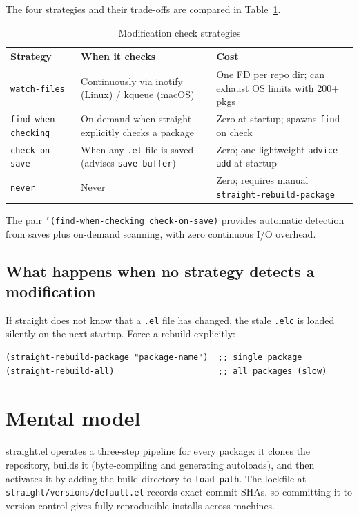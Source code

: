The four strategies and their trade-offs are compared in Table~\ref{tab:straight-check-strategies}.

\begin{table}
\centering
\caption{Modification check strategies}
\label{tab:straight-check-strategies}
\begin{tabularx}{\linewidth}{@{}llX@{}}
\toprule
Strategy & When it checks & Cost \\
\midrule
\texttt{watch-files} & Continuously via inotify (Linux) / kqueue (macOS) & One FD per repo dir; can exhaust OS limits with 200+ pkgs \\
\texttt{find-when-checking} & On demand when straight explicitly checks a package & Zero at startup; spawns \texttt{find} on check \\
\texttt{check-on-save} & When any \texttt{.el} file is saved (advises \texttt{save-buffer}) & Zero; one lightweight \texttt{advice-add} at startup \\
\texttt{never} & Never & Zero; requires manual \texttt{straight-rebuild-package} \\
\bottomrule
\end{tabularx}
\end{table}

The pair \texttt{'(find-when-checking check-on-save)} provides automatic detection from saves plus on-demand scanning, with zero continuous I/O overhead.

\subsection{What happens when no strategy detects a modification}\label{what-happens-when-no-strategy-detects-a-modification}

If straight does not know that a \texttt{.el} file has changed, the stale \texttt{.elc} is loaded silently on the next startup. Force a rebuild explicitly:

\begin{verbatim}
(straight-rebuild-package "package-name")  ;; single package
(straight-rebuild-all)                     ;; all packages (slow)
\end{verbatim}

\section{Mental model}
straight.el operates a three-step pipeline for every package: it clones the repository, builds it (byte-compiling and generating autoloads), and then activates it by adding the build directory to \texttt{load-path}.  The lockfile at \texttt{straight/versions/default.el} records exact commit SHAs, so committing it to version control gives fully reproducible installs across machines.

